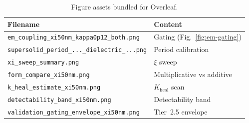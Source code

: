 \documentclass[11pt,a4paper]{article}
\begin{document}
\begin{table}[ht]
  \centering
  \small
  \caption{Figure assets bundled for Overleaf.}
  \label{tab:figures}
  \begin{tabular}{@{}ll@{}}
    \toprule
    Filename & Content \\
    \midrule
    \texttt{em\_coupling\_xi50nm\_kappa0p12\_both.png} & Gating (Fig.~\ref{fig:em-gating}) \\
    \texttt{supersolid\_period\_...\_dielectric\_...png} & Period calibration \\
    \texttt{xi\_sweep\_summary.png} & $\xi$ sweep \\
    \texttt{form\_compare\_xi50nm.png} & Multiplicative vs additive \\
    \texttt{k\_heal\_estimate\_xi50nm.png} & $K_{\mathrm{heal}}$ scan \\
    \texttt{detectability\_band\_xi50nm.png} & Detectability band \\
    \texttt{validation\_gating\_envelope\_xi50nm.png} & Tier~2.5 envelope \\
    \bottomrule
  \end{tabular}
\end{table}
\end{document}
